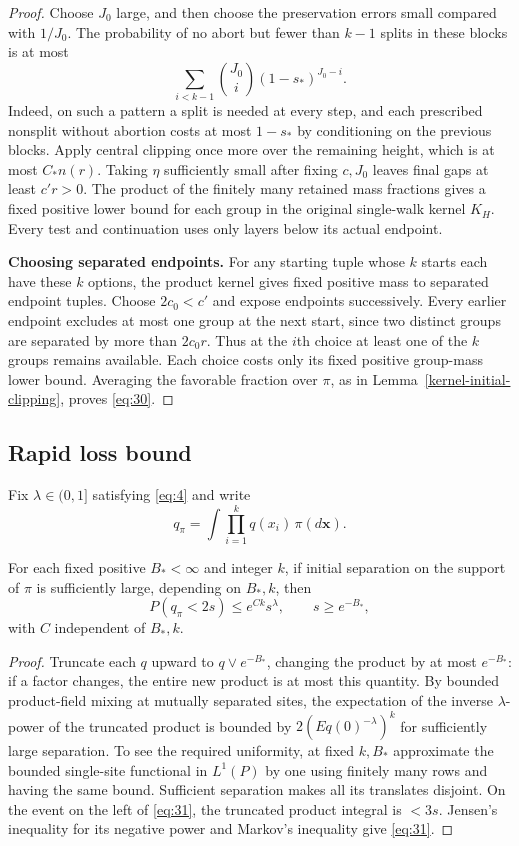 \begin{proof}
Choose \(J_0\) large, and then choose the preservation errors small
compared with \(1/J_0\). The probability of no abort but fewer than
\(k-1\) splits in these blocks is at most
\[
\sum_{i<k-1}\binom{J_0}{i}(1-s_*)^{J_0-i}.
\]
Indeed, on such a pattern a split is needed at every step, and each
prescribed nonsplit without abortion costs at most \(1-s_*\) by
conditioning on the previous blocks. Apply central clipping once more
over the remaining height, which is at most \(C_*n(r)\). Taking
\(\eta\) sufficiently small after fixing \(c,J_0\) leaves final
gaps at least \(c'r>0\). The product of the finitely many retained
mass fractions gives a fixed positive lower bound for each group in
the original single-walk kernel \(K_H\). Every test and continuation
uses only layers below its actual endpoint.

\smallskip\noindent\textbf{Choosing separated endpoints.}
For any starting tuple whose \(k\) starts each have these \(k\) options,
the product kernel gives fixed positive mass to separated endpoint
tuples. Choose \(2c_0<c'\) and expose endpoints successively. Every
earlier endpoint excludes at most one group at the next start, since
two distinct groups are separated by more than \(2c_0r\). Thus at the
\(i\)th choice at least one of the \(k\) groups remains available.
Each choice costs only its fixed positive group-mass lower bound.
Averaging the favorable fraction over \(\pi\), as in
Lemma~\ref{kernel-initial-clipping}, proves \eqref{eq:30}.
\end{proof}

\subsection{Rapid loss bound}

Fix \(\lambda\in(0,1]\) satisfying \eqref{eq:4} and write
\[
q_\pi=\int\prod_{i=1}^k q(x_i)\,\pi(d\mathbf x).
\]

\begin{lemma}\label{kernel-inverse-moment}
For each fixed positive \(B_*<\infty\) and integer \(k\), if initial
separation on the support of \(\pi\) is sufficiently large, depending
on \(B_*,k\), then
\[
P(q_\pi<2s)\le e^{C k}s^\lambda,\qquad s\ge e^{-B_*},
\tag{31}\label{eq:31}
\]
with \(C\) independent of \(B_*,k\).
\end{lemma}

\begin{proof}
Truncate each \(q\) upward to \(q\vee e^{-B_*}\), changing the product
by at most \(e^{-B_*}\): if a factor changes, the entire new product is
at most this quantity. By bounded product-field mixing at mutually
separated sites, the expectation of the inverse \(\lambda\)-power of
the truncated product is bounded by \(2(Eq(0)^{-\lambda})^k\) for
sufficiently large separation. To see the required uniformity, at fixed
\(k,B_*\) approximate the bounded single-site functional in \(L^1(P)\)
by one using finitely many rows and having the same bound. Sufficient
separation makes all its translates disjoint. On the event on the left
of \eqref{eq:31}, the truncated product integral is \(<3s\). Jensen's
inequality for its negative power and Markov's inequality give
\eqref{eq:31}.
\end{proof}

